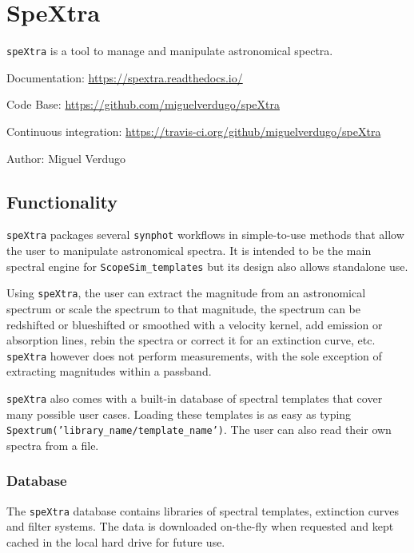 

\section{SpeXtra%
  \label{spextra}%
}

\texttt{speXtra} is a tool to manage and manipulate astronomical spectra.

Documentation: \url{https://spextra.readthedocs.io/}

Code Base: \url{https://github.com/miguelverdugo/speXtra}

Continuous integration: \url{https://travis-ci.org/github/miguelverdugo/speXtra}

Author: Miguel Verdugo


\subsection{Functionality%
  \label{functionality}%
}

\texttt{speXtra} packages several \texttt{synphot} workflows in simple-to-use methods that allow the user
to manipulate astronomical spectra. It is intended to be the main spectral engine for \texttt{ScopeSim\_templates}
but its design also allows standalone use.

Using \texttt{speXtra}, the user can extract the magnitude from an astronomical spectrum or
scale the spectrum to that magnitude, the spectrum can be redshifted or
blueshifted or smoothed with a velocity kernel, add emission or absorption lines,
rebin the spectra or correct it for an extinction curve, etc. \texttt{speXtra} however does not perform
measurements, with the sole exception of extracting magnitudes within a passband.

\texttt{speXtra} also comes with a built-in database of spectral templates  that cover many possible user cases.
Loading these templates is as easy as typing \texttt{Spextrum('library\_name/template\_name')}. The user
can also read their own spectra from a file.


\subsubsection{Database%
  \label{database}%
}

The \texttt{speXtra} database contains libraries of spectral templates, extinction curves and filter systems.
The data is downloaded on-the-fly when requested and kept cached in the local hard drive for future use.

